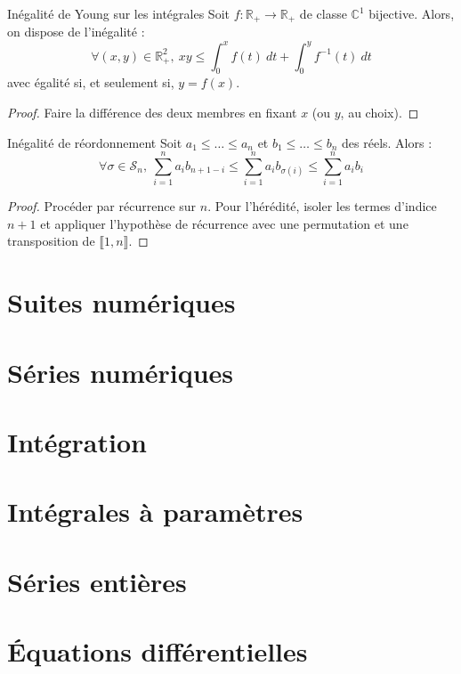 \documentclass[french]{article}
\newcommand{\R}{\mathbb{R}}
\newcommand{\C}{\mathbb{C}}
\newcommand{\inv}{^{-1}}
\theoremstyle{theorem}
\theoremstyle{definition}
\begin{document}
\begin{lem}{Inégalité de Young sur les intégrales}
	Soit $f:\R_+\to\R_+$ de classe $\C^1$ bijective. Alors, on dispose de l'inégalité : $$\forall (x,y)\in\R_+^2,\ xy\leqslant\int_{0}^{x}f(t)\ dt+\int_{0}^{y}f\inv(t)\ dt$$ avec égalité si, et seulement si, $y=f(x)$.
\end{lem}
\begin{proof}
	Faire la différence des deux membres en fixant $x$ (ou $y$, au choix).
\end{proof}
\begin{lem}{Inégalité de réordonnement}
	Soit $a_1\leqslant\ldots\leqslant a_n$ et $b_1\leqslant\ldots\leqslant b_n$ des réels. Alors : $$\forall\sigma\in\mathcal{S}_n,\ \sum_{i=1}^{n}a_ib_{n+1-i}\leqslant\sum_{i=1}^{n}a_ib_{\sigma(i)}\leqslant\sum_{i=1}^{n}a_ib_i$$
\end{lem}
\begin{proof}
	Procéder par récurrence sur $n$. Pour l'hérédité, isoler les termes d'indice $n+1$ et appliquer l'hypothèse de récurrence avec une permutation et une transposition de $\llbracket1,n\rrbracket$.
\end{proof}

\section{Suites numériques}

\section{Séries numériques}

\section{Intégration}

\section{Intégrales à paramètres}

\section{Séries entières}

\section{Équations différentielles}
\end{document}
